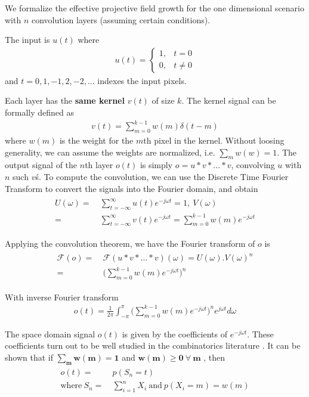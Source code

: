 We formalize the effective projective field growth for the one dimensional scenario with $n$ convolution layers (assuming certain conditions).

The input is $u(t)$ where
\begin{align}
	u(t) = 
	\begin{cases}
		1, & t = 0\\
		0, & t \neq 0 
	\end{cases}
\end{align}
and $t = 0, 1, -1, 2, -2, ...$ indexes the input pixels.

Each layer has the \textbf{same kernel} $v(t)$ of size $k$. The kernel signal can be formally defined as
\begin{align}
	v(t) = \sum_{m=0}^{k-1} w(m)\delta(t-m)
\end{align}
where $w(m)$ is the weight for the $m$th pixel in the kernel.
Without loosing generality, we can assume the weights are normalized, i.e. $\sum_{m}w(w)=1$. The output signal of the $n$th layer $o(t)$ is simply $o = u * v * ... * v$, convolving $u$ with $n$ such $v$\'s.
To compute the convolution, we can use the Discrete Time Fourier Transform to convert the signals into the Fourier domain, and obtain
\begin{align}
\begin{split}
	U(\omega) =&~ \sum_{t=-\infty}^{\infty} u(t)e^{-j\omega t} = 1, ~V(\omega) \\=&~ \sum_{t=-\infty}^{\infty} v(t)e^{-j\omega t} = \sum_{m=0}^{k-1} w(m)e^{-j\omega t}
\end{split}
\end{align}

Applying the convolution theorem, we have the Fourier transform of $o$ is
\begin{align}
\begin{split}
	\mathcal{F}(o) =&~ \mathcal{F}(u*v*...*v)(\omega) = U(\omega) . V(\omega)^n \\=&~ \Bigg(\sum_{m=0}^{k-1}w(m)e^{-j\omega t}\Bigg)^n
\end{split}
\end{align}

With inverse Fourier transform
\begin{align}
	o(t) = \frac{1}{2\pi}\int_{-\pi}^{\pi}\Big(\sum_{m=0}^{k-1}w(m)e^{-j\omega t}\Big)^ne^{j\omega t} d\omega
\end{align}

The space domain signal $o(t)$ is given by the coefficients of $e^{-j\omega t}$.
These coefficients turn out to be well studied in the combinatorics literature \cite{eger2013restricted}.
It can be shown that if $\mathbf{\sum_{m}w(m) = 1}$  and $\mathbf{w(m) \geq 0 ~\forall~ m}$ , then
\begin{align}
\begin{split}
	o(t) =&~ p(S_n=t)\\ 
	\text{where}~ S_n =&~ \sum_{i=1}^{n} X_i ~\text{and}~p(X_i=m) = w(m)
\end{split}
\end{align}

